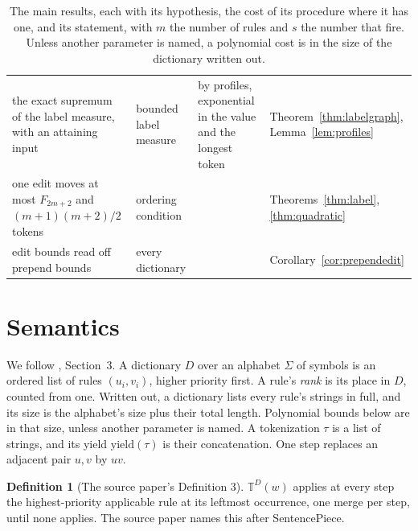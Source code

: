 \documentclass[11pt,a4paper]{article}
\theoremstyle{definition}
\newtheorem{definition}{Definition}
\theoremstyle{plain}
\newcommand{\T}{\mathbb{T}}
\newcommand{\yield}{\mathrm{yield}}
\begin{document}
\begin{table}[!t]
\begin{tabular}{@{}>{\raggedright\arraybackslash}p{}>{\raggedright\arraybackslash}p{}
  >{\raggedright\arraybackslash}p{}>{\raggedright\arraybackslash}p{}@{}}
\addlinespace
the exact supremum of the label measure, with an attaining input & bounded label measure & by profiles,
exponential in the value and the longest token & Theorem~\ref{thm:labelgraph},
Lemma~\ref{lem:profiles} \\
\addlinespace
one edit moves at most \(F_{2m+2}\) and \((m + 1)(m + 2)/2\) tokens & ordering condition & &
Theorems~\ref{thm:label}, \ref{thm:quadratic} \\
\addlinespace
edit bounds read off prepend bounds & every dictionary & & Corollary~\ref{cor:prependedit} \\
\bottomrule
\end{tabular}
\caption{The main results, each with its hypothesis, the cost of its procedure where it has one, and its statement,
with \(m\) the number of rules and \(s\) the number that fire. Unless another parameter is named, a polynomial cost is
in the size of the dictionary written out.}
\label{tab:results}
\end{table}

\FloatBarrier
\section{Semantics}\label{sec:semantics}

We follow \citet{berglund2023formalizing}, Section~3. A dictionary \(D\) over an alphabet \(\Sigma\) of symbols is an
ordered list of rules \((u_i, v_i)\), higher priority first. A rule's \emph{rank} is its place in \(D\), counted from
one. Written out, a dictionary lists every rule's strings in full, and its size is the alphabet's size plus their total
length. Polynomial bounds below are in that size, unless another parameter is named. A tokenization \(\tau\) is a list
of strings, and its yield \(\yield(\tau)\) is their concatenation. One step replaces an adjacent pair \(u, v\) by
\(uv\).


\begin{definition}[The source paper's Definition 3]\label{def:sp}
\(\T^D(w)\) applies at every step the highest-priority applicable rule at its leftmost occurrence, one merge per step,
until none applies. The source paper names this after SentencePiece.
\end{definition}
\end{document}
